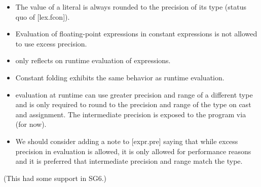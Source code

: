 \begin{itemize}
  \item The value of a \fp literal is always rounded to the precision of its
    type (status quo of [lex.fcon]).

  \item Evaluation of floating-point expressions in constant expressions is not
    allowed to use excess precision.

  \item {} only reflects on runtime evaluation of \fp
    expressions.

  \item Constant folding exhibits the same behavior as runtime evaluation.

  \item \Fp evaluation at runtime can use greater precision and range of
    a different \fp type and is only required to round to the precision and
    range of the \fp type on cast and assignment.
    The intermediate precision is exposed to the program via
     (for now).

  \item We should consider adding a note to [expr.pre] saying that while excess
    precision in evaluation is allowed, it is only allowed for performance
    reasons and it is preferred that intermediate precision and range match the
    \fp type.
\end{itemize}
(This had some support in SG6.)\\
